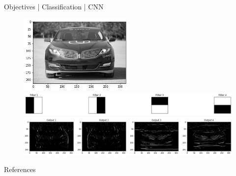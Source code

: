 \documentclass{beamer}
\begin{document}
    \begin{frame}{Objectives | Classification | CNN}
        \begin{figure}[hbt]
        	\center
        	\includegraphics[width=0.5\textwidth]{img/car.png}
        	\includegraphics[width=1.0\textwidth]{img/filters_pure.png}
        	\includegraphics[width=1.0\textwidth]{img/filters.png}
        	\label{fig:filters}
        \end{figure}
    \end{frame}
    
    \begin{frame}[allowframebreaks]{References}
    
      
      
    
    \end{frame}
    
\end{document}
